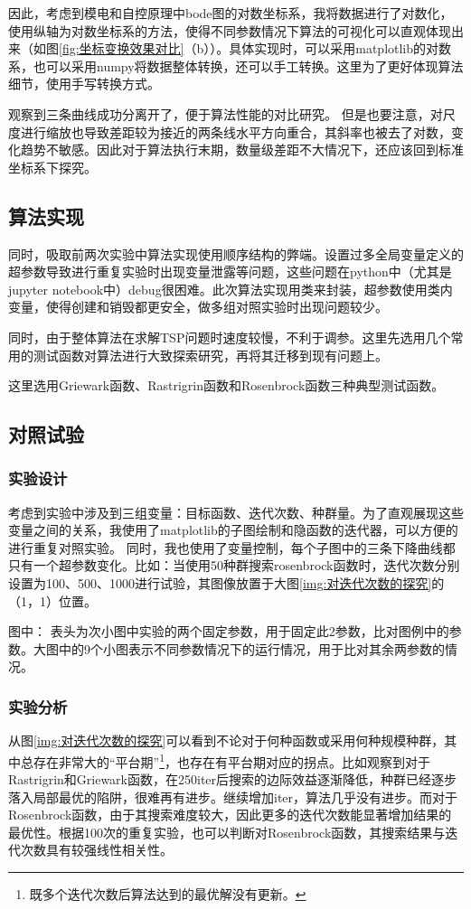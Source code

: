 \documentclass[lang=cn,11pt]{elegantpaper}
\begin{document}
因此，考虑到模电和自控原理中bode图的对数坐标系，我将数据进行了对数化，使用纵轴为对数坐标系的方法，使得不同参数情况下算法的可视化可以直观体现出来（如图\ref{fig:坐标变换效果对比}（b））。具体实现时，可以采用matplotlib的对数系，也可以采用numpy将数据整体转换，还可以手工转换。这里为了更好体现算法细节，使用手写转换方式。

观察到三条曲线成功分离开了，便于算法性能的对比研究。
但是也要注意，对尺度进行缩放也导致差距较为接近的两条线水平方向重合，其斜率也被去了对数，变化趋势不敏感。因此对于算法执行末期，数量级差距不大情况下，还应该回到标准坐标系下探究。


\subsection{算法实现}
同时，吸取前两次实验中算法实现使用顺序结构的弊端。设置过多全局变量定义的超参数导致进行重复实验时出现变量泄露等问题，这些问题在python中（尤其是jupyter notebook中）debug很困难。此次算法实现用类来封装，超参数使用类内变量，使得创建和销毁都更安全，做多组对照实验时出现问题较少。

同时，由于整体算法在求解TSP问题时速度较慢，不利于调参。这里先选用几个常用的测试函数对算法进行大致探索研究，再将其迁移到现有问题上。

这里选用Griewark函数、Rastrigrin函数和Rosenbrock函数三种典型测试函数。

\subsection{对照试验}
\subsubsection{实验设计}
考虑到实验中涉及到三组变量：目标函数、迭代次数、种群量。为了直观展现这些变量之间的关系，我使用了matplotlib的子图绘制和隐函数的迭代器，可以方便的进行重复对照实验。
同时，我也使用了变量控制，每个子图中的三条下降曲线都只有一个超参数变化。比如：当使用50种群搜索rosenbrock函数时，迭代次数分别设置为100、500、1000进行试验，其图像放置于大图\ref{img:对迭代次数的探究}的（1，1）位置。

图中：
表头为次小图中实验的两个固定参数，用于固定此2参数，比对图例中的参数。大图中的9个小图表示不同参数情况下的运行情况，用于比对其余两参数的情况。

\subsubsection{实验分析}
从图\ref{img:对迭代次数的探究}可以看到不论对于何种函数或采用何种规模种群，其中总存在非常大的“平台期”\footnote{既多个迭代次数后算法达到的最优解没有更新。}，也存在有平台期对应的拐点。比如观察到对于Rastrigrin和Griewark函数，在250iter后搜索的边际效益逐渐降低，种群已经逐步落入局部最优的陷阱，很难再有进步。继续增加iter，算法几乎没有进步。而对于Rosenbrock函数，由于其搜索难度较大，因此更多的迭代次数能显著增加结果的最优性。根据100次的重复实验，也可以判断对Rosenbrock函数，其搜索结果与迭代次数具有较强线性相关性。
\end{document}
